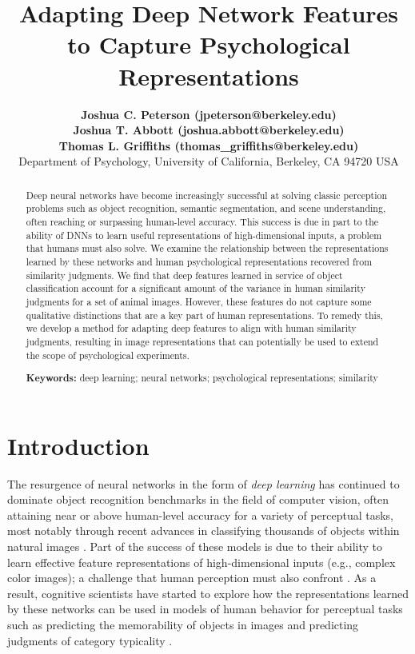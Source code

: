 \documentclass[10pt,letterpaper]{article}
\title{Adapting Deep Network Features to Capture Psychological Representations}
\author{
{\large \bf Joshua C. Peterson (jpeterson@berkeley.edu)} \\
{\large \bf Joshua T. Abbott (joshua.abbott@berkeley.edu)}\\
{\large \bf Thomas L. Griffiths (thomas\_griffiths@berkeley.edu)} \\
  Department of Psychology, University of California, Berkeley, CA 94720 USA}
\begin{document}
\maketitle

\begin{abstract}
Deep neural networks have become increasingly successful at solving classic perception problems such as object recognition, semantic segmentation, and scene understanding, often reaching or surpassing human-level accuracy. This success is due in part to the ability of DNNs to learn useful representations of high-dimensional inputs, a problem that humans must also solve. We examine the relationship between the representations learned by these networks and human psychological representations recovered from similarity judgments. We find that deep features learned in service of object classification account for a significant amount of the variance in human similarity judgments for a set of animal images. However, these features do not capture some qualitative distinctions that are a key part of human representations. To remedy this, we develop a method for adapting deep features to align with human similarity judgments, resulting in image representations that can potentially be used to extend the scope of psychological experiments.

\textbf{Keywords:}
deep learning; neural networks; psychological representations; similarity
\end{abstract}

\section{Introduction}
The resurgence of neural networks in the form of \textit{deep learning} has continued to dominate object recognition benchmarks in the field of computer vision, often attaining near or above human-level accuracy for a variety of perceptual tasks, most notably through recent advances in classifying thousands of objects within natural images \citep*{krizhevsky2012imagenet,he2015delving}. Part of the success of these models is due to their ability to learn effective feature representations of high-dimensional inputs (e.g., complex color images); a challenge that human perception must also confront \citep*{austerweil_nonparametric_2013}. As a result, cognitive scientists have started to explore how the representations learned by these networks can be used in models of human behavior for perceptual tasks such as predicting the memorability of objects in images \citep*{ICCV15_ObjectMemorability} and predicting judgments of category typicality  \citep*{lake_deep_2015}.
\end{document}
